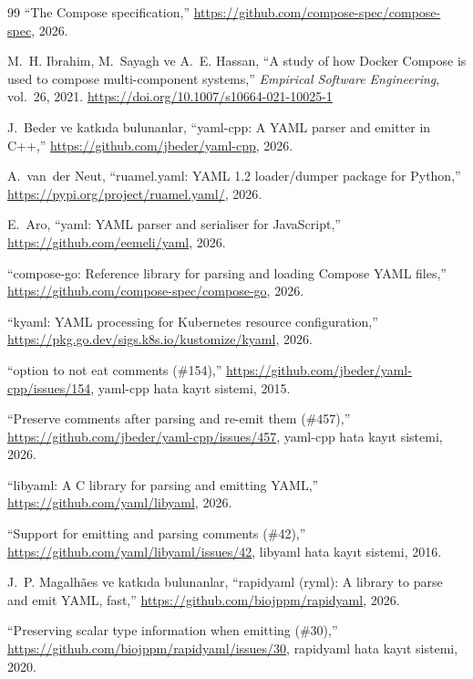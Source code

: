\documentclass[conference]{IEEEtran}
\begin{document}
\begin{thebibliography}{99}
``The Compose specification,'' \url{https://github.com/compose-spec/compose-spec}, 2026.

M.~H. Ibrahim, M.~Sayagh ve A.~E. Hassan, ``A study of how {Docker Compose} is used to compose multi-component systems,'' \emph{Empirical Software Engineering}, vol.~26, 2021. \url{https://doi.org/10.1007/s10664-021-10025-1}

J.~Beder ve katkıda bulunanlar, ``yaml-cpp: A {YAML} parser and emitter in {C++},'' \url{https://github.com/jbeder/yaml-cpp}, 2026.

A.~van~der Neut, ``ruamel.yaml: {YAML} 1.2 loader/dumper package for {Python},'' \url{https://pypi.org/project/ruamel.yaml/}, 2026.

E.~Aro, ``yaml: {YAML} parser and serialiser for {JavaScript},'' \url{https://github.com/eemeli/yaml}, 2026.

``compose-go: Reference library for parsing and loading {Compose YAML} files,'' \url{https://github.com/compose-spec/compose-go}, 2026.

``kyaml: {YAML} processing for {Kubernetes} resource configuration,'' \url{https://pkg.go.dev/sigs.k8s.io/kustomize/kyaml}, 2026.

``option to not eat comments (\#154),'' \url{https://github.com/jbeder/yaml-cpp/issues/154}, yaml-cpp hata kayıt sistemi, 2015.

``Preserve comments after parsing and re-emit them (\#457),'' \url{https://github.com/jbeder/yaml-cpp/issues/457}, yaml-cpp hata kayıt sistemi, 2026.

``libyaml: A {C} library for parsing and emitting {YAML},'' \url{https://github.com/yaml/libyaml}, 2026.

``Support for emitting and parsing comments (\#42),'' \url{https://github.com/yaml/libyaml/issues/42}, libyaml hata kayıt sistemi, 2016.

J.~P. Magalhães ve katkıda bulunanlar, ``rapidyaml (ryml): A library to parse and emit {YAML}, fast,'' \url{https://github.com/biojppm/rapidyaml}, 2026.

``Preserving scalar type information when emitting (\#30),'' \url{https://github.com/biojppm/rapidyaml/issues/30}, rapidyaml hata kayıt sistemi, 2020.


\end{thebibliography}
\end{document}

